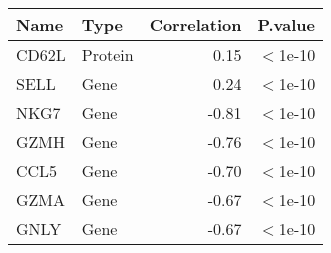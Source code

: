 \begin{tabular}{llrl}
  \hline
Name & Type & Correlation & P.value \\ 
  \hline
CD62L & Protein & 0.15 & $<$1e-10 \\ 
  SELL & Gene & 0.24 & $<$1e-10 \\ 
  NKG7 & Gene & -0.81 & $<$1e-10 \\ 
  GZMH & Gene & -0.76 & $<$1e-10 \\ 
  CCL5 & Gene & -0.70 & $<$1e-10 \\ 
  GZMA & Gene & -0.67 & $<$1e-10 \\ 
  GNLY & Gene & -0.67 & $<$1e-10 \\ 
   \hline
\end{tabular}
